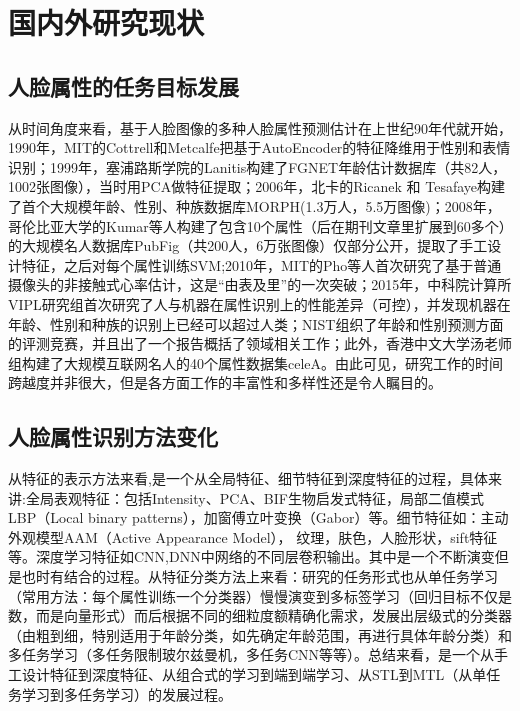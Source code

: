 \section{国内外研究现状}
\subsection{人脸属性的任务目标发展}
从时间角度来看，基于人脸图像的多种人脸属性预测估计在上世纪90年代就开始，1990年，MIT的Cottrell和Metcalfe把基于AutoEncoder的特征降维用于性别和表情识别\cite{EMPATH}；1999年，塞浦路斯学院的Lanitis构建了FGNET年龄估计数据库（共82人，1002张图像），当时用PCA做特征提取\cite{FGNET}；2006年，北卡的Ricanek 和 Tesafaye构建了首个大规模年龄、性别、种族数据库MORPH(1.3万人，5.5万图像)\cite{MORPH}；2008年，哥伦比亚大学的Kumar等人构建了包含10个属性（后在期刊文章里扩展到60多个）的大规模名人数据库PubFig（共200人，6万张图像）仅部分公开，提取了手工设计特征，之后对每个属性训练SVM\cite{FACETRACER};2010年，MIT的Pho等人首次研究了基于普通摄像头的非接触式心率估计，这是“由表及里”的一次突破；2015年，中科院计算所VIPL研究组首次研究了人与机器在属性识别上的性能差异（可控），并发现机器在年龄、性别和种族的识别上已经可以超过人类\cite{HUHAN}；NIST组织了年龄和性别预测方面的评测竞赛，并且出了一个报告概括了领域相关工作\cite{FERET}；此外，香港中文大学汤老师组构建了大规模互联网名人的40个属性数据集celeA\cite{CELEA}。由此可见，研究工作的时间跨越度并非很大，但是各方面工作的丰富性和多样性还是令人瞩目的。
\subsection{人脸属性识别方法变化}
从特征的表示方法来看,是一个从全局特征、细节特征到深度特征的过程，具体来讲:全局表观特征：包括Intensity、PCA\cite{PCA}、BIF生物启发式特征\cite{BIF}，局部二值模式LBP（Local binary patterns）\cite{LBP}，加窗傅立叶变换（Gabor）等。细节特征如：主动外观模型AAM（Active  Appearance  Model）\cite{AAM}，
纹理，肤色，人脸形状，sift特征等。深度学习特征\cite{ADIENCE}\cite{CNNSVM}如CNN,DNN中网络的不同层卷积输出。其中是一个不断演变但是也时有结合的过程。从特征分类方法上来看：研究的任务形式也从单任务学习（常用方法：每个属性训练一个分类器）慢慢演变到多标签学习\cite{CELEA}\cite{HUHAN}（回归目标不仅是数，而是向量形式）而后根据不同的细粒度额精确化需求，发展出层级式的分类器（由粗到细，特别适用于年龄分类，如先确定年龄范围，再进行具体年龄分类）和多任务学习\cite{MULTITASK}（多任务限制玻尔兹曼机，多任务CNN等等）。总结来看，是一个从手工设计特征到深度特征、从组合式的学习到端到端学习、从STL到MTL（从单任务学习到多任务学习）的发展过程。

